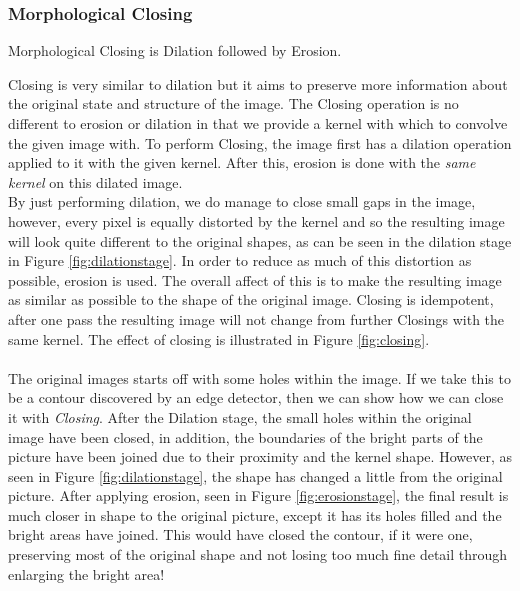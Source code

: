 \documentclass[11pt]{article}
\begin{document}
\subsubsection{Morphological Closing}
\label{sec:morphologicalclosing}
\begin{center}
Morphological Closing is Dilation followed by Erosion.
\end{center}
Closing is very similar to dilation but it aims to preserve more information
about the original state and structure of the image.
The Closing operation is no different to erosion or dilation in that we
provide a kernel with which to convolve the given image with. To perform Closing,
the image first has a dilation operation applied to it with the given kernel. 
After this, erosion is done with the \textit{same kernel} on this dilated image. \\
By just performing dilation, we do manage to close small gaps in the image, 
however, every pixel is equally distorted by the kernel and so the resulting
image will look quite different to the original shapes, as can be seen
in the dilation stage in Figure \ref{fig:dilationstage}. 
In order to reduce as much
of this distortion as possible, erosion is used. The overall affect of this is
to make the resulting image as similar as possible to the shape of the
original image. Closing is idempotent, after one pass the resulting
image will not change from further Closings with the same kernel. The effect 
of closing is illustrated in Figure \ref{fig:closing}.\\
\\
The original images starts off with some holes within the image. If we
take this to be a contour discovered by an edge detector, then we can show
how we can close it with \textit{Closing}. After the Dilation stage, the
small holes within the original image have been closed, in addition, the 
boundaries of the bright parts of the picture have been joined due to their
proximity and the kernel shape. However, as seen in Figure \ref{fig:dilationstage},
the shape has changed a little from the original picture. After applying
erosion, seen in Figure \ref{fig:erosionstage}, the final result is much closer
in shape to the original picture, except it has its holes filled and the 
bright areas have joined. This would have closed the contour, if it were one,
preserving most of the original shape and not
losing too much fine detail through enlarging the bright area!
\end{document}
